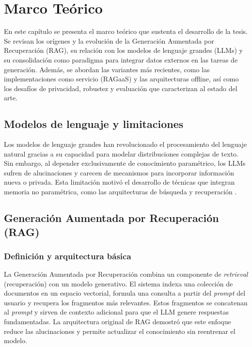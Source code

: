 \chapter{Marco Teórico}
\label{chap:background}

\noindent
En este capítulo se presenta el marco teórico que sustenta el desarrollo de la tesis. Se revisan los orígenes y la evolución de la Generación Aumentada por Recuperación (RAG), su relación con los modelos de lenguaje grandes (LLMs) y su consolidación como paradigma para integrar datos externos en las tareas de generación. Además, se abordan las variantes más recientes, como las implementaciones como servicio (RAGaaS) y las arquitecturas offline, así como los desafíos de privacidad, robustez y evaluación que caracterizan al estado del arte.

\section{Modelos de lenguaje y limitaciones}

Los modelos de lenguaje grandes han revolucionado el procesamiento del lenguaje natural gracias a su capacidad para modelar distribuciones complejas de texto. Sin embargo, al depender exclusivamente de conocimiento paramétrico, los LLMs sufren de alucinaciones y carecen de mecanismos para incorporar información nueva o privada. Esta limitación motivó el desarrollo de técnicas que integran memoria no paramétrica, como las arquitecturas de búsqueda y recuperación \cite{Lewis2020RAG,Guu2020REALM}.

\section{Generación Aumentada por Recuperación (RAG)}

\subsection{Definición y arquitectura básica}

La Generación Aumentada por Recuperación combina un componente de \emph{retrieval} (recuperación) con un modelo generativo. El sistema indexa una colección de documentos en un espacio vectorial, formula una consulta a partir del \emph{prompt} del usuario y recupera los fragmentos más relevantes. Estos fragmentos se concatenan al \emph{prompt} y sirven de contexto adicional para que el LLM genere respuestas fundamentadas. La arquitectura original de RAG \cite{Lewis2020RAG} demostró que este enfoque reduce las alucinaciones y permite actualizar el conocimiento sin reentrenar el modelo.

